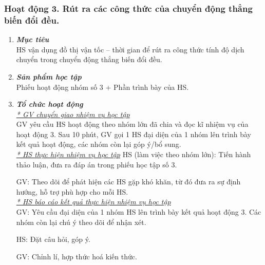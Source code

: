 \subsubsection{Hoạt động 3. Rút ra các công thức của chuyển động thẳng biến đổi đều.}
\begin{enumerate}[label=\bfseries\itshape \arabic*.]
	\item \textbf{\textit{Mục tiêu}}\\
	HS vận dụng đồ thị vận tốc – thời gian để rút ra công thức tính độ dịch chuyển trong chuyển động thẳng biến đổi đều.
	\item \textbf{\textit{Sản phẩm học tập}}\\
	Phiếu hoạt động nhóm số 3 + Phần trình bày của HS.
	\item \textbf{\textit{Tổ chức hoạt động}}\\
	\textit{\underline{* GV chuyển giao nhiệm vụ học tập}}\\
	GV yêu cầu HS hoạt động theo nhóm lớn đã chia và đọc kĩ nhiệm vụ của hoạt động 3. Sau 10 phút, GV gọi 1 HS đại diện của 1 nhóm lên trình bày kết quả hoạt động, các nhóm còn lại góp ý/bổ sung.\\
	\textit{\underline{* HS thực hiện nhiệm vụ học tập}}
	HS (làm việc theo nhóm lớn): Tiến hành thảo luận, đưa ra đáp án trong phiếu học tập số 3. 
	
	GV: Theo dõi để phát hiện các HS gặp khó khăn, từ đó đưa ra sự định hướng, hỗ trợ phù hợp cho mỗi HS.\\
	\textit{\underline{* HS báo cáo kết quả thực hiện nhiệm vụ học tập}}\\
	GV: Yêu cầu đại diện của 1 nhóm HS lên trình bày kết quả hoạt động 3. Các nhóm còn lại chú ý theo dõi để nhận xét.
	
	HS: Đặt câu hỏi, góp ý.
	
	GV: Chỉnh lí, hợp thức hoá kiến thức.
	
	
\end{enumerate}
